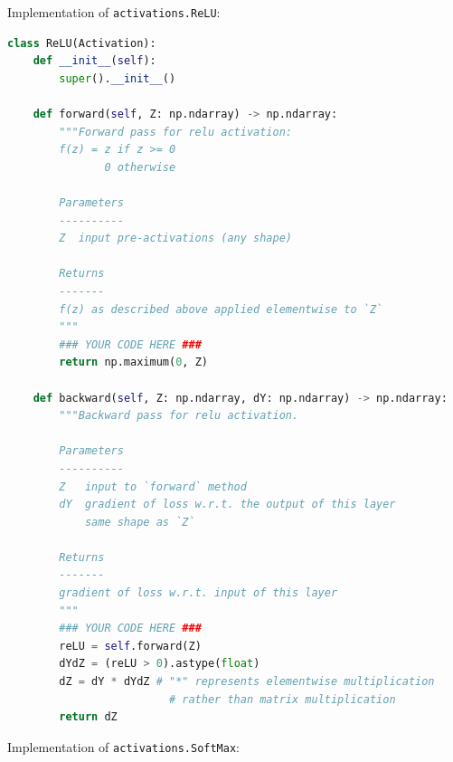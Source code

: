 \documentclass{article}[a4paper,11pt]
\begin{document}
Implementation of \texttt{activations.ReLU}:

\begin{lstlisting}[language=Python]
class ReLU(Activation):
    def __init__(self):
        super().__init__()

    def forward(self, Z: np.ndarray) -> np.ndarray:
        """Forward pass for relu activation:
        f(z) = z if z >= 0
               0 otherwise
        
        Parameters
        ----------
        Z  input pre-activations (any shape)

        Returns
        -------
        f(z) as described above applied elementwise to `Z`
        """
        ### YOUR CODE HERE ###
        return np.maximum(0, Z)

    def backward(self, Z: np.ndarray, dY: np.ndarray) -> np.ndarray:
        """Backward pass for relu activation.
        
        Parameters
        ----------
        Z   input to `forward` method
        dY  gradient of loss w.r.t. the output of this layer
            same shape as `Z`

        Returns
        -------
        gradient of loss w.r.t. input of this layer
        """
        ### YOUR CODE HERE ###
        reLU = self.forward(Z)
        dYdZ = (reLU > 0).astype(float)
        dZ = dY * dYdZ # "*" represents elementwise multiplication 
                         # rather than matrix multiplication
        return dZ

\end{lstlisting}

Implementation of \texttt{activations.SoftMax}:
\end{document}
